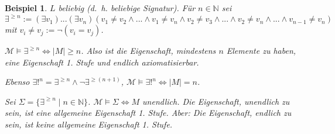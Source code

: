 \documentclass{article}
\theoremstyle{definition}
\theoremstyle{plain}
\newtheorem*{bsp}{Beispiel}
\newcommand{\m}[1]{\mathcal{#1}}
\begin{document}
    \begin{bsp}
        $ L $ beliebig (d.~h. beliebige Signatur).
        Für $ n \in \mathbb{N} $ sei
        \begin{equation*}
            \exists^{\geq n} := (\exists v_1) ... (\exists v_n) (v_1 \not = v_2 \land ... \land v_1 \not = v_n \land v_2 \not = v_3 \land ... \land v_2 \not = v_n \land ... \land v_{n-1} \not = v_n)
        \end{equation*}
        mit $ v_i \not = v_j := \neg (v_i = v_j) $.

        $ \m{M} \models \exists^{\geq n} \Leftrightarrow | M | \geq n $.
        Also ist die Eigenschaft, mindestens $ n $ Elemente zu haben, eine Eigenschaft 1. Stufe und endlich axiomatisierbar.

        Ebenso $ \exists!^n = \exists^{\geq n} \land \neg \exists^{\geq(n+1)} $, $ \m{M} \models \exists!^n \Leftrightarrow |M| = n $.

        Sei $ \Sigma = \{ \exists^{\geq n} \mid n \in \mathbb{N} \} $.
        $ \m{M} \models \Sigma \Leftrightarrow M $ unendlich.
        Die Eigenschaft, unendlich zu sein, ist eine allgemeine Eigenschaft 1. Stufe.
        Aber: Die Eigenschaft, endlich zu sein, ist keine allgemeine Eigenschaft 1. Stufe.
    \end{bsp}
\end{document}

